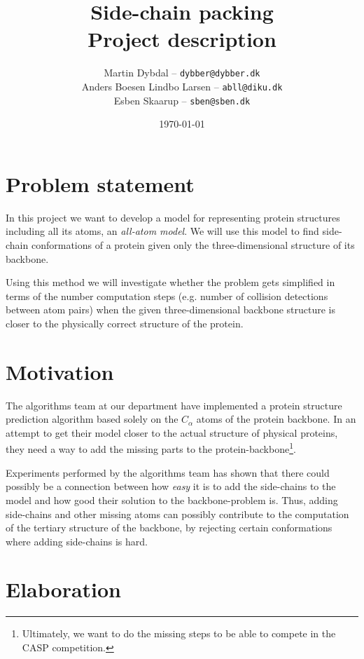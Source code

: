 \documentclass[10pt,a4paper,final,twoside,openany,article]{memoir}
\title{
  Side-chain packing \\
  \small{Project description}
}
\author{
	Martin Dybdal -- \texttt{dybber@dybber.dk}\\
	Anders Boesen Lindbo Larsen -- \texttt{abll@diku.dk} \\
    Esben Skaarup -- \texttt{sben@sben.dk}
}
\date{\today}
\begin{document}
\maketitle

\section{Problem statement}
In this project we want to develop a model for representing protein
structures including all its atoms, an \textit{all-atom model}.  We
will use this model to find side-chain conformations of a protein
given only the three-dimensional structure of its backbone.

Using this method we will investigate whether the problem gets
simplified in terms of the number computation steps (e.g. number of
collision detections between atom pairs) when the given
three-dimensional backbone structure is closer to the physically
correct structure of the protein.  

\section{Motivation}
The algorithms team at our department have implemented a protein
structure prediction algorithm based solely on the $C_\alpha$ atoms of
the protein backbone. In an attempt to get their model closer to the
actual structure of physical proteins, they need a way to add the
missing parts to the protein-backbone\footnote{Ultimately, we want to
  do the missing steps to be able to compete in the
  CASP competition.}.

Experiments performed by the algorithms team has shown that there
could possibly be a connection between how \textit{easy} it is to add
the side-chains to the model and how good their solution to the
backbone-problem is. Thus, adding side-chains and other missing atoms
can possibly contribute to the computation of the tertiary structure
of the backbone, by rejecting certain conformations where adding
side-chains is hard.

\section{Elaboration}

\begin{figure}
  \centering
\end{figure}
\end{document}
